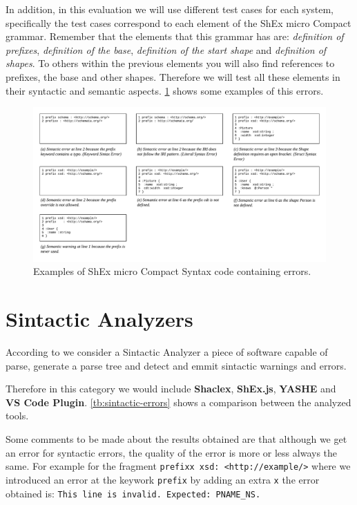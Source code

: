 In addition, in this evaluation we will use different test cases for each system, specifically the test cases
correspond to each element of the ShEx micro Compact grammar. Remember that the elements that this grammar has
are: \textit{definition of prefixes}, \textit{definition of the base}, \textit{definition of the start shape} and
\textit{definition of shapes}.
To others within the previous elements you will also find references to prefixes, the base and other shapes.
Therefore we will test all these elements in their syntactic and semantic aspects. \cref{fig:shexc-micro-errors}
shows some examples of this errors.

\begin{figure}
    \includegraphics[width=\textwidth]{images/shexc-micro-bad-examples.pdf}
    \centering
    \caption[Examples of ShEx micro Compact Syntax code containing sintactic and semantic errors or warnings]{Examples of ShEx micro Compact Syntax
    code containing errors.}
    \label{fig:shexc-micro-errors}
  \end{figure}

\section{Sintactic Analyzers}
According to \cite{floyd1963syntactic} we consider a Sintactic Analyzer a piece of software capable of parse, generate
a parse tree and detect and emmit sintactic warnings and errors.

Therefore in this category we would include \textbf{Shaclex}, \textbf{ShEx.js}, \textbf{YASHE} and \textbf{VS Code Plugin}.
\cref{tb:sintactic-errors} shows a comparison between the analyzed tools.

Some comments to be made about the results obtained are that although we get an error for syntactic errors,
the quality of the error is more or less always the same. For example for the fragment \texttt{prefixx xsd: <http://example/>}
where we introduced an error at the keywork \texttt{prefix} by adding an extra \texttt{x} the error obtained is: \texttt{This line is invalid. Expected: PNAME\_NS.}

